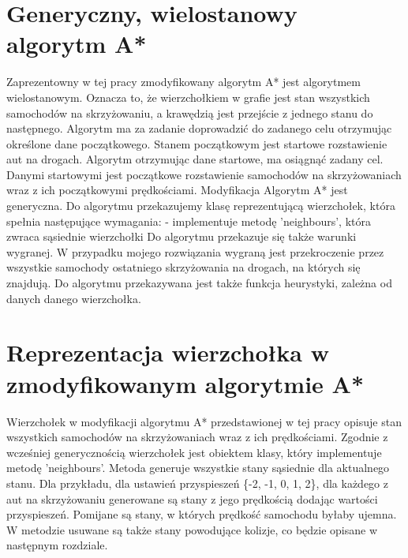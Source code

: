 \section{Generyczny, wielostanowy algorytm A*}

Zaprezentowny w tej pracy zmodyfikowany algorytm A* jest algorytmem wielostanowym. Oznacza to, że wierzchołkiem w grafie jest stan wszystkich samochodów na skrzyżowaniu, a krawędzią jest przejście z jednego stanu do następnego.
\newline
\newline
Algorytm ma za zadanie doprowadzić do zadanego celu otrzymując określone dane początkowego. Stanem początkowym jest startowe rozstawienie aut na drogach.
\newline
\newline
Algorytm otrzymując dane startowe, ma osiągnąć zadany cel. Danymi startowymi jest początkowe rozstawienie samochodów na skrzyżowaniach wraz z ich początkowymi prędkościami.
\newline
\newline
Modyfikacja Algorytm A* jest generyczna. Do algorytmu przekazujemy klasę reprezentującą wierzchołek, która spełnia następujące wymagania:
\newline
- implementuje metodę 'neighbours', która zwraca sąsiednie wierzchołki 
\newline
\newline
Do algorytmu przekazuje się także warunki wygranej. W przypadku mojego rozwiązania wygraną jest przekroczenie przez wszystkie samochody ostatniego skrzyżowania na drogach, na których się znajdują.
\newline
\newline
Do algorytmu przekazywana jest także funkcja heurystyki, zależna od danych danego wierzchołka.

\section{Reprezentacja wierzchołka w zmodyfikowanym algorytmie A*}

Wierzchołek w modyfikacji algorytmu A* przedstawionej w tej pracy opisuje stan wszystkich samochodów na skrzyżowaniach wraz z ich prędkościami.
\newline
\newline
Zgodnie z wcześniej generycznością wierzchołek jest obiektem klasy, który implementuje metodę 'neighbours'. Metoda generuje wszystkie stany sąsiednie dla aktualnego stanu. Dla przykładu, dla ustawień przyspieszeń \{-2, -1, 0, 1, 2\}, dla każdego z aut na skrzyżowaniu generowane są stany z jego prędkością dodając wartości przyspieszeń. Pomijane są stany, w których prędkość samochodu byłaby ujemna.
\newline
\newline
W metodzie usuwane są także stany powodujące kolizje, co będzie opisane w następnym rozdziale.

